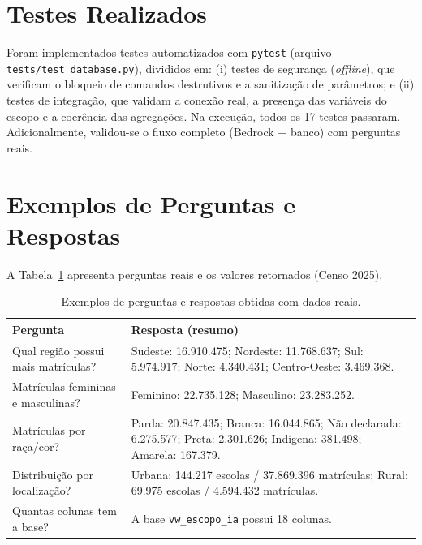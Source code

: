 \documentclass[
    12pt,
    oneside,
    a4paper,
    chapter=TITLE,
    section=TITLE
]{abntex2}
\begin{document}
\section{Testes Realizados}
Foram implementados testes automatizados com \texttt{pytest} (arquivo
\texttt{tests/test\_database.py}), divididos em: (i) testes de segurança (\textit{offline}), que
verificam o bloqueio de comandos destrutivos e a sanitização de parâmetros; e (ii) testes de
integração, que validam a conexão real, a presença das variáveis do escopo e a coerência das
agregações. Na execução, todos os 17 testes passaram. Adicionalmente, validou-se o fluxo completo
(Bedrock + banco) com perguntas reais.

\section{Exemplos de Perguntas e Respostas}
A Tabela~\ref{tab:exemplos} apresenta perguntas reais e os valores retornados (Censo 2025).

\begin{table}[H]
\centering
\caption{Exemplos de perguntas e respostas obtidas com dados reais.}
\label{tab:exemplos}
\begin{tabular}{p{6cm} p{8cm}}
\toprule
\textbf{Pergunta} & \textbf{Resposta (resumo)} \\
\midrule
Qual região possui mais matrículas? & Sudeste: 16.910.475; Nordeste: 11.768.637; Sul: 5.974.917; Norte: 4.340.431; Centro-Oeste: 3.469.368. \\
\addlinespace
Matrículas femininas e masculinas? & Feminino: 22.735.128; Masculino: 23.283.252. \\
\addlinespace
Matrículas por raça/cor? & Parda: 20.847.435; Branca: 16.044.865; Não declarada: 6.275.577; Preta: 2.301.626; Indígena: 381.498; Amarela: 167.379. \\
\addlinespace
Distribuição por localização? & Urbana: 144.217 escolas / 37.869.396 matrículas; Rural: 69.975 escolas / 4.594.432 matrículas. \\
\addlinespace
Quantas colunas tem a base? & A base \texttt{vw\_escopo\_ia} possui 18 colunas. \\
\bottomrule
\end{tabular}
\end{table}
\end{document}
